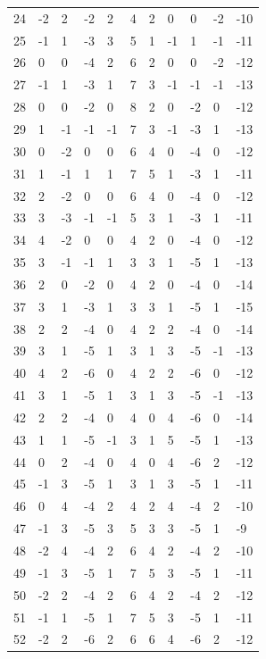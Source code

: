 \begin{table}[H]
\begin{tabular}{lllllllllll}
24 & -2 & 2 & -2 & 2 & 4 & 2 & 0 & 0 & -2 & -10 \\
25 & -1 & 1 & -3 & 3 & 5 & 1 & -1 & 1 & -1 & -11 \\
26 & 0 & 0 & -4 & 2 & 6 & 2 & 0 & 0 & -2 & -12 \\
27 & -1 & 1 & -3 & 1 & 7 & 3 & -1 & -1 & -1 & -13 \\
28 & 0 & 0 & -2 & 0 & 8 & 2 & 0 & -2 & 0 & -12 \\
29 & 1 & -1 & -1 & -1 & 7 & 3 & -1 & -3 & 1 & -13 \\
30 & 0 & -2 & 0 & 0 & 6 & 4 & 0 & -4 & 0 & -12 \\
31 & 1 & -1 & 1 & 1 & 7 & 5 & 1 & -3 & 1 & -11 \\
32 & 2 & -2 & 0 & 0 & 6 & 4 & 0 & -4 & 0 & -12 \\
33 & 3 & -3 & -1 & -1 & 5 & 3 & 1 & -3 & 1 & -11 \\
34 & 4 & -2 & 0 & 0 & 4 & 2 & 0 & -4 & 0 & -12 \\
35 & 3 & -1 & -1 & 1 & 3 & 3 & 1 & -5 & 1 & -13 \\
36 & 2 & 0 & -2 & 0 & 4 & 2 & 0 & -4 & 0 & -14 \\
37 & 3 & 1 & -3 & 1 & 3 & 3 & 1 & -5 & 1 & -15 \\
38 & 2 & 2 & -4 & 0 & 4 & 2 & 2 & -4 & 0 & -14 \\
39 & 3 & 1 & -5 & 1 & 3 & 1 & 3 & -5 & -1 & -13 \\
40 & 4 & 2 & -6 & 0 & 4 & 2 & 2 & -6 & 0 & -12 \\
41 & 3 & 1 & -5 & 1 & 3 & 1 & 3 & -5 & -1 & -13 \\
42 & 2 & 2 & -4 & 0 & 4 & 0 & 4 & -6 & 0 & -14 \\
43 & 1 & 1 & -5 & -1 & 3 & 1 & 5 & -5 & 1 & -13 \\
44 & 0 & 2 & -4 & 0 & 4 & 0 & 4 & -6 & 2 & -12 \\
45 & -1 & 3 & -5 & 1 & 3 & 1 & 3 & -5 & 1 & -11 \\
46 & 0 & 4 & -4 & 2 & 4 & 2 & 4 & -4 & 2 & -10 \\
47 & -1 & 3 & -5 & 3 & 5 & 3 & 3 & -5 & 1 & -9 \\
48 & -2 & 4 & -4 & 2 & 6 & 4 & 2 & -4 & 2 & -10 \\
49 & -1 & 3 & -5 & 1 & 7 & 5 & 3 & -5 & 1 & -11 \\
50 & -2 & 2 & -4 & 2 & 6 & 4 & 2 & -4 & 2 & -12 \\
51 & -1 & 1 & -5 & 1 & 7 & 5 & 3 & -5 & 1 & -11 \\
52 & -2 & 2 & -6 & 2 & 6 & 6 & 4 & -6 & 2 & -12 \\

\end{tabular}
\end{table}
